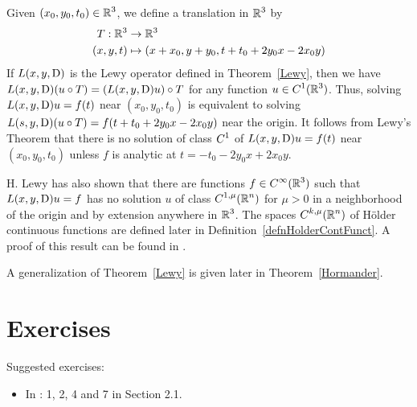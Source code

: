 \begin{rmk}
Given $\displaystyle (x_0,y_0,t_0) \in \mathbb{R}^3$, we define a translation
in $\displaystyle \mathbb{R}^3$ by
\begin{align*}
T:\mathbb{R}^3 &\to \mathbb{R}^3 \\
 (x,y,t) &\mapsto (x+x_0,y+y_0, t+t_0 +2y_0x - 2x_0 y)
\end{align*}
If $L(x,y,\operatorname{D})$ is the Lewy operator defined in Theorem~\ref{Lewy},
then we have
$\displaystyle L(x,y,\operatorname{D})(u \circ T) = \left(L(x,y,\operatorname{D})u\right) \circ T$
for any function $\displaystyle u \in C^1(\mathbb{R}^3)$.
Thus, solving $L(x,y,\operatorname{D})u = f(t)$ near $(x_0,y_0,t_0)$ is
equivalent to solving $L(s,y,\operatorname{D})(u\circ T) = f(t+t_0+2y_0x - 2x_0y)$
near the origin.  It follows from Lewy's Theorem that there is no solution of
class $\displaystyle C^1$ of $L(x,y,\operatorname{D})u = f(t)$ near
$(x_0,y_0,t_0)$ unless $f$ is
analytic at $t=-t_0-2y_0x + 2x_0y$.

H. Lewy has also shown that there are functions
$\displaystyle f \in C^{\infty}(\mathbb{R}^3)$
such that $L(x,y,\operatorname{D})u = f$ has no solution $u$ of class
$\displaystyle C^{1,\mu}(\mathbb{R}^n)$ for $\mu > 0$ in a neighborhood of
the origin and by extension anywhere in $\displaystyle \mathbb{R}^3$.  The spaces
$\displaystyle C^{k,\mu}(\mathbb{R}^n)$ of Hölder continuous functions are
defined later in Definition~\ref{defnHolderContFunct}.  A proof of
this result can be found in \cite{Smo}.
\end{rmk}

A generalization of Theorem~\ref{Lewy} is given later in
Theorem~\ref{Hormander}.

\section{Exercises}

Suggested exercises:

\begin{itemize}
\item In \cite{McO}: 1, 2, 4 and 7 in Section 2.1.
\end{itemize}


